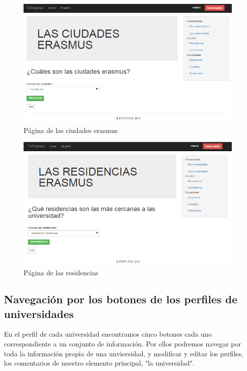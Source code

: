 \begin{figure}[htbp]
	
	\centering
	\includegraphics[scale=0.4]{./Figuras/tuerasmusPages/privatePages/ciudades.png}
	\caption{P\'agina de las ciudades erasmus}
	\label{fig:ciud}
	
\end{figure}
\begin{figure}[htbp]
	
	\centering
	\includegraphics[scale=0.4]{./Figuras/tuerasmusPages/privatePages/residencias.png}
	\caption{P\'agina de las residencias}
	\label{fig:res}
	
\end{figure}

\subsection{Navegaci\'on por los botones de los perfiles de universidades}
En el perfil de cada universidad encontramos cinco botones cada uno correspondiente a un conjunto de informaci\'on. Por ellos podremos navegar por toda la informaci\'on propia de una unviersidad, y modificar y editar los perfiles, los comentarios de nuestro elemento principal, "la universidad".\\

